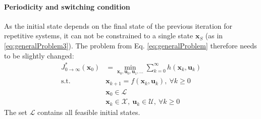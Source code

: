 \paragraph{Periodicity and switching condition}
As the initial state depends on the final state of the previous iteration for repetitive systems, it can not be constrained to a single state $\bm{x}_S$ (as in \eqref{eq:generalProblem3}). The problem from Eq. \eqref{eq:generalProblem} therefore needs to be slightly changed:
\begin{subequations}\label{eq:generalNewProblem}
\begin{align}
J_{0\rightarrow \infty}^*(\bm{x}_0)&=\min_{\bm{x}_0,\bm{u}_0,\bm{u}_1,\ldots} \sum\limits_{k=0}^{\infty} h(\bm{x}_k,\bm{u}_k)\\
\textrm{s.t. }
&\bm{x}_{k+1}=f(\bm{x}_k,\bm{u}_k),~\forall k\geq 0 \\
&\bm{x}_0 \in \mathcal{L} \\
&\bm{x}_k \in \mathcal{X},~\bm{u}_k \in \mathcal{U},~\forall k\geq 0
\end{align}
\end{subequations}
The set $\mathcal{L}$ contains all feasible initial states.

